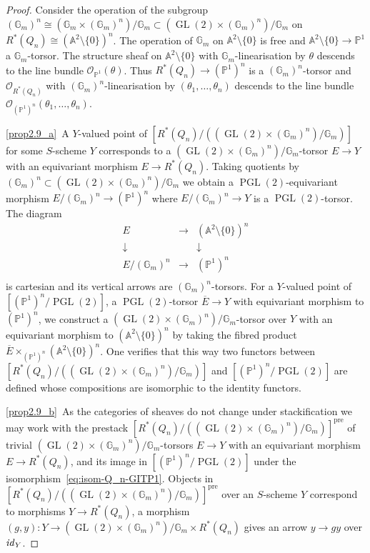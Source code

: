 \documentclass[10pt,a4paper]{amsart}
\theoremstyle{definition}
\def\id{{\it id}}
\def\A{\mathds A}
\def\G{\mathds G}
\def\P{\mathds P}
\def\O{\mathcal O}
\DeclareMathOperator{\GL}{GL}
\DeclareMathOperator{\PGL}{PGL}
\begin{document}
\begin{proof}
Consider the operation of the subgroup $(\G_m)^n\cong(\G_m\times(\G_m)^n)/\G_m
\subset(\GL(2)\times(\G_m)^n)/\G_m$ on $R^*(Q_n)\cong(\A^2\setminus\{0\})^n$.
The operation of $\G_m$ on $\A^2\setminus\{0\}$ is free and $\A^2\setminus\{0\}\to\P^1$
a $\G_m$-torsor. 
The structure sheaf on $\A^2\setminus\{0\}$ with $\G_m$-linearisation by $\theta$ 
descends to the line bundle $\O_{\P^1}(\theta)$. Thus $R^*(Q_n)\to(\P^1)^n$ is a 
$(\G_m)^n$-torsor and $\O_{R^*(Q_n)}$ with $(\G_m)^n$-linearisation by 
$(\theta_1,\ldots,\theta_n)$ descends to the line bundle 
$\O_{(\P^1)^n}(\theta_1,\ldots,\theta_n)$. %

\ref{prop2.9_a}~A $Y$-valued point of $[R^*(Q_n)/((\GL(2)\times(\G_m)^n)/\G_m)]$ for some 
$S$-scheme $Y$ corresponds to a $(\GL(2)\times(\G_m)^n)/\G_m$-torsor
$E\to Y$ with an equivariant morphism $E\to R^*(Q_n)$.
Taking quotients by $(\G_m)^n\subset (\GL(2)\times(\G_m)^n)/\G_m$ 
we obtain a $\PGL(2)$-equivariant morphism $E/(\G_m)^n\to(\P^1)^n$
where $E/(\G_m)^n\to Y$ is a $\PGL(2)$-torsor. The diagram
\[
\begin{array}{ccc}
E&\longrightarrow&(\A^2\setminus\{0\})^n\\
\downarrow&&\downarrow\\
E/(\G_m)^n&\longrightarrow&(\P^1)^n\\
\end{array}
\]
is cartesian and its vertical arrows are $(\G_m)^n$-torsors. For a $Y$-valued point of 
$[(\P^1)^n/\PGL(2)]$, a $\PGL(2)$-torsor $\overline{E}\to Y$ with equivariant morphism
to $(\P^1)^n$, we construct a $(\GL(2)\times(\G_m)^n)/\G_m$-torsor over $Y$ with an 
equivariant morphism to $(\A^2\setminus\{0\})^n$ by taking the fibred product 
$\overline{E}\times_{(\P^1)^n}(\A^2\setminus\{0\})^n$.
One verifies that this way two functors between
$[R^*(Q_n)/((\GL(2)\times(\G_m)^n)/\G_m)]$ and $[(\P^1)^n/\PGL(2)]$
are defined whose compositions are isomorphic to the identity functors.

\ref{prop2.9_b}~As the categories of sheaves do not change under stackification we may work with 
the prestack $[R^*(Q_n)/((\GL(2)\times(\G_m)^n)/\G_m)]^\text{pre}$ of trivial 
$(\GL(2)\times(\G_m)^n)/\G_m$-torsors $E\to Y$ with an equivariant morphism 
$E\to R^*(Q_n)$, and its image in $[(\P^1)^n/\PGL(2)]$ under the isomorphism~\eqref{eq:isom-Q_n-GITP1}. 
Objects in $[R^*(Q_n)/((\GL(2)\times(\G_m)^n)/\G_m)]^\text{pre}$ over an 
$S$-scheme $Y$ correspond to morphisms $Y\to R^*(Q_n)$, a morphism 
$(g,y)\colon Y\to (\GL(2)\times(\G_m)^n)/\G_m\times R^*(Q_n)$ gives an arrow 
$y\to gy$ over $\id_Y$.


\end{proof}
\end{document}
